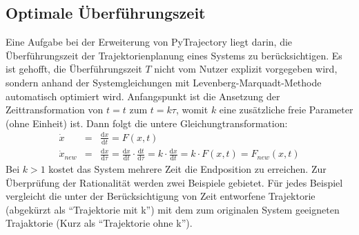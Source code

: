 \subsection{Optimale Überführungszeit}
\label{Optimale_Überführungszeit}
Eine Aufgabe bei der Erweiterung von PyTrajectory liegt darin, die Überführungszeit der Trajektorienplanung eines Systems zu berücksichtigen. 
Es ist gehofft, die Überführungszeit $T$ nicht vom Nutzer explizit vorgegeben wird, sondern anhand der Systemgleichungen mit Levenberg-Marquadt-Methode automatisch optimiert wird. Anfangspunkt ist die Ansetzung der Zeittransformation von $t = t$ zum $t = k\tau$, womit $k$ eine zusätzliche freie Parameter (ohne Einheit) ist. Dann folgt die untere Gleichungtransformation:
\begin{eqnarray}
\dot{x} &=& \frac{\mathrm{d} x}{\mathrm{d} t} = F\left ( x,t \right ) \label{eq:ori}\\
\dot{x}_{new} &=& \frac{\mathrm{d} x}{\mathrm{d} \tau} = \frac{\mathrm{d} x}{\mathrm{d} t}\cdot \frac{\mathrm{d} t}{\mathrm{d} \tau} = k\cdot \frac{\mathrm{d} x}{\mathrm{d} t} = k\cdot F(x,t) = F_{new}\left ( x,t \right )\label{eq:mit_k}
\end{eqnarray}
Bei $k>1$ kostet das System mehrere Zeit die Endposition zu erreichen.
Zur Überprüfung der Rationalität werden zwei Beispiele gebietet. Für jedes Beispiel vergleicht die unter der Berücksichtigung von Zeit entworfene Trajektorie (abgekürzt als ``Trajektorie mit k'') mit dem zum originalen System geeigneten Trajaktorie (Kurz als ``Trajektorie ohne k'').
